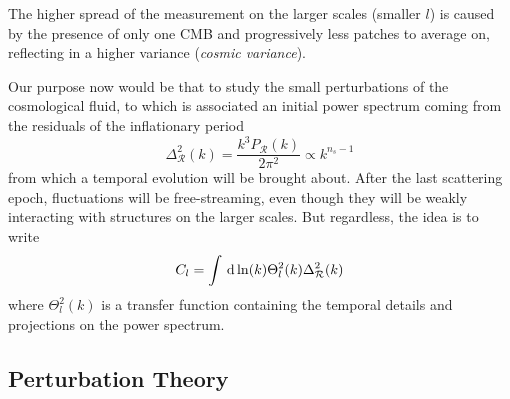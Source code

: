 \par The higher spread of the measurement on the larger scales (smaller $l$) is caused by the presence of only one CMB and progressively less patches to average on, reflecting in a higher variance (\emph{cosmic variance}).
\par Our purpose now would be that to study the small perturbations of the cosmological fluid, to which is associated an initial power spectrum coming from the residuals of the inflationary period 
\begin{equation}
    \Delta_{\mathcal{R}}^{2}(k) = \frac{k^{3}P_{\mathcal{R}}(k)}{2\pi^{2}} \propto k^{n_{s}-1}
    \label{eq:primordialps}
\end{equation}
from which a temporal evolution will be brought about. After the last scattering epoch, fluctuations will be free-streaming, even though they will be weakly interacting with structures on the larger scales. But regardless, the idea is to write 
\begin{equation}
    C_{l} = \int \,\text{d}\ln(k) \Theta_{l}^{2}(k)\Delta_{\mathcal{R}}^{2}(k)
\end{equation}
where $\Theta_{l}^{2}(k)$ is a transfer function containing the temporal details and projections on the power spectrum.

\subsection{Perturbation Theory}

